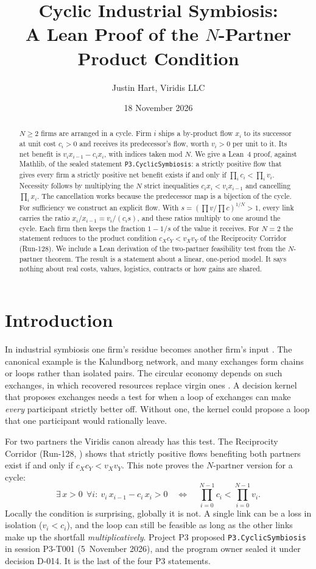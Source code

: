 \documentclass[11pt]{article}
\title{Cyclic Industrial Symbiosis:\\ A Lean Proof of the $N$-Partner Product Condition}
\author{Justin Hart, Viridis LLC}
\date{18 November 2026}
\theoremstyle{definition}
\theoremstyle{remark}
\begin{document}
\maketitle

\begin{abstract}
$N\ge2$ firms are arranged in a cycle. Firm $i$ ships a by-product flow $x_i$ to its successor at
unit cost $c_i>0$ and receives its predecessor's flow, worth $v_i>0$ per unit to it. Its net benefit
is $v_ix_{i-1}-c_ix_i$, with indices taken mod $N$. We give a Lean~4 proof, against Mathlib, of the
sealed statement \texttt{P3.CyclicSymbiosis}: a strictly positive flow that gives every firm a
strictly positive net benefit exists if and only if $\prod_i c_i<\prod_i v_i$. Necessity follows by
multiplying the $N$ strict inequalities $c_ix_i<v_ix_{i-1}$ and cancelling $\prod_i x_i$. The
cancellation works because the predecessor map is a bijection of the cycle. For sufficiency we
construct an explicit flow. With $s=(\prod v/\prod c)^{1/N}>1$, every link carries the ratio
$x_i/x_{i-1}=v_i/(c_is)$, and these ratios multiply to one around the cycle. Each firm then keeps the
fraction $1-1/s$ of the value it receives. For $N=2$ the statement reduces to the product condition
$c_Xc_Y<v_Xv_Y$ of the Reciprocity Corridor (Run-128). We include a Lean derivation of the two-partner
feasibility test from the $N$-partner theorem. The result is a statement about a linear,
one-period model. It says nothing about real costs, values, logistics, contracts or how gains are
shared.
\end{abstract}

\section{Introduction}
In industrial symbiosis one firm's residue becomes another firm's input \citep{chertow2000}. The
canonical example is the Kalundborg network, and many exchanges form chains or loops rather than
isolated pairs. The circular economy depends on such exchanges, in which recovered resources
replace virgin ones \citep{geissdoerfer2017}. A decision kernel that proposes exchanges needs a
test for when a loop of exchanges can make \emph{every} participant strictly better off. Without
one, the kernel could propose a loop that one participant would rationally leave.

For two partners the Viridis canon already has this test. The Reciprocity Corridor (Run-128,
\citealp{hart2026rc}) shows that strictly positive flows benefiting both partners exist if and
only if $c_Xc_Y<v_Xv_Y$. This note proves the $N$-partner version for a cycle:
\[
\exists\,x>0\ \ \forall i:\ v_i\,x_{i-1}-c_i\,x_i>0
\quad\Longleftrightarrow\quad
\prod_{i=0}^{N-1}c_i<\prod_{i=0}^{N-1}v_i .
\]
Locally the condition is surprising, globally it is not. A single link can be a loss in isolation
($v_i<c_i$), and the loop can still be feasible as long as the other links make up the shortfall
\emph{multiplicatively}. Project P3 proposed \texttt{P3.CyclicSymbiosis} in session P3-T001
(5~November 2026), and the program owner sealed it under decision D-014. It is the last of the
four P3 statements.
\end{document}
